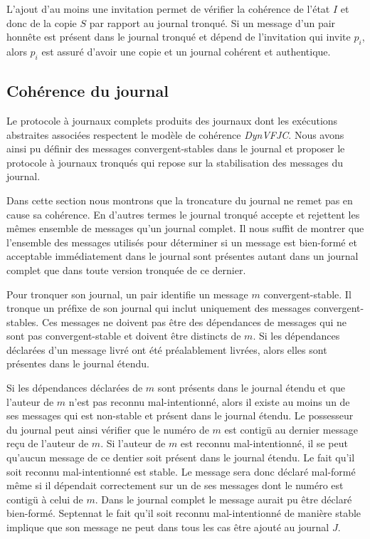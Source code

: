 L'ajout d'au moins une invitation permet de vérifier la cohérence de l'état $I$ et donc de la copie $S$ par rapport au journal tronqué.
Si un message d'un pair honnête est présent dans le journal tronqué et dépend de l'invitation qui invite $p_i$, alors $p_i$ est assuré d'avoir une copie et un journal cohérent et authentique.


\subsection{Cohérence du journal}

Le protocole à journaux complets produits des journaux dont les exécutions abstraites associées respectent le modèle de cohérence \emph{DynVFJC}.
Nous avons ainsi pu définir des messages convergent-stables dans le journal et proposer le protocole à journaux tronqués qui repose sur la stabilisation des messages du journal.

Dans cette section nous montrons que la troncature du journal ne remet pas en cause sa cohérence.
En d'autres termes le journal tronqué accepte et rejettent les mêmes ensemble de messages qu'un journal complet.
Il nous suffit de montrer que l'ensemble des messages utilisés pour déterminer si un message est bien-formé et acceptable immédiatement dans le journal sont présentes autant dans un journal complet que dans toute version tronquée de ce dernier.

Pour tronquer son journal, un pair identifie un message $m$ convergent-stable.
Il tronque un préfixe de son journal qui inclut uniquement des messages convergent-stables.
Ces messages ne doivent pas être des dépendances de messages qui ne sont pas convergent-stable et doivent être distincts de $m$.
Si les dépendances déclarées d'un message livré ont été préalablement livrées, alors elles sont présentes dans le journal étendu.

Si les dépendances déclarées de $m$ sont présents dans le journal étendu et que l'auteur de $m$ n'est pas reconnu mal-intentionné, alors il existe au moins un de ses messages qui est non-stable et présent dans le journal étendu.
Le possesseur du journal peut ainsi vérifier que le numéro de $m$ est contigü au dernier message reçu de l'auteur de $m$.
Si l'auteur de $m$ est reconnu mal-intentionné, il se peut qu'aucun message de ce dentier soit présent dans le journal étendu.
Le fait qu'il soit reconnu mal-intentionné est stable.
Le message sera donc déclaré mal-formé même si il dépendait correctement sur un de ses messages dont le numéro est contigü à celui de $m$.
Dans le journal complet le message aurait pu être déclaré bien-formé.
Septennat le fait qu'il soit reconnu mal-intentionné de manière stable implique que son message ne peut dans tous les cas être ajouté au journal $J$.

